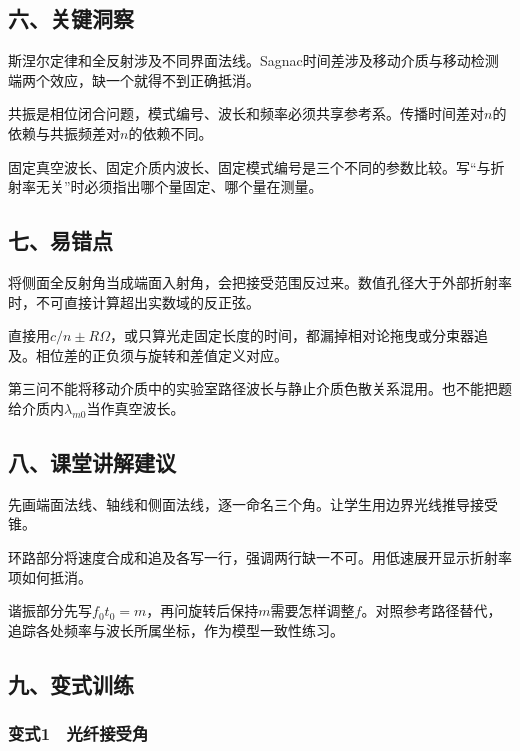\documentclass[12pt,a4paper,fontset=fandol]{ctexart}
\begin{document}
\subsection{六、关键洞察}\label{ux516dux5173ux952eux6d1eux5bdf-5}

斯涅尔定律和全反射涉及不同界面法线。Sagnac时间差涉及移动介质与移动检测端两个效应，缺一个就得不到正确抵消。

共振是相位闭合问题，模式编号、波长和频率必须共享参考系。传播时间差对\(n\)的依赖与共振频差对\(n\)的依赖不同。

固定真空波长、固定介质内波长、固定模式编号是三个不同的参数比较。写``与折射率无关''时必须指出哪个量固定、哪个量在测量。

\subsection{七、易错点}\label{ux4e03ux6613ux9519ux70b9-5}

将侧面全反射角当成端面入射角，会把接受范围反过来。数值孔径大于外部折射率时，不可直接计算超出实数域的反正弦。

直接用\(c/n\pm R\Omega\)，或只算光走固定长度的时间，都漏掉相对论拖曳或分束器追及。相位差的正负须与旋转和差值定义对应。

第三问不能将移动介质中的实验室路径波长与静止介质色散关系混用。也不能把题给介质内\(\lambda_{m0}\)当作真空波长。

\subsection{八、课堂讲解建议}\label{ux516bux8bfeux5802ux8bb2ux89e3ux5efaux8bae-5}

先画端面法线、轴线和侧面法线，逐一命名三个角。让学生用边界光线推导接受锥。

环路部分将速度合成和追及各写一行，强调两行缺一不可。用低速展开显示折射率项如何抵消。

谐振部分先写\(f_0t_0=m\)，再问旋转后保持\(m\)需要怎样调整\(f\)。对照参考路径替代，追踪各处频率与波长所属坐标，作为模型一致性练习。

\subsection{九、变式训练}\label{ux4e5dux53d8ux5f0fux8badux7ec3-5}

\subsubsection{变式1　光纤接受角}\label{ux53d8ux5f0f1-ux5149ux7ea4ux63a5ux53d7ux89d2}
\end{document}
